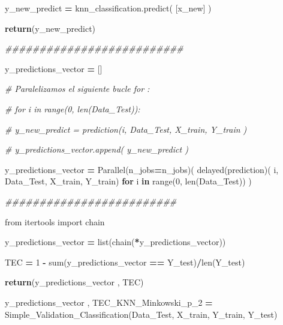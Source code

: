 \documentclass[
  11pt,
  a4paper,
]{article}
\newenvironment{Shaded}{\begin{snugshade}}{\end{snugshade}}
\newcommand{\BuiltInTok}[1]{#1}
\newcommand{\CommentTok}[1]{\textcolor[rgb]{0.56,0.35,0.01}{\textit{#1}}}
\newcommand{\ControlFlowTok}[1]{\textcolor[rgb]{0.13,0.29,0.53}{\textbf{#1}}}
\newcommand{\DecValTok}[1]{\textcolor[rgb]{0.00,0.00,0.81}{#1}}
\newcommand{\ImportTok}[1]{#1}
\newcommand{\KeywordTok}[1]{\textcolor[rgb]{0.13,0.29,0.53}{\textbf{#1}}}
\newcommand{\NormalTok}[1]{#1}
\newcommand{\OperatorTok}[1]{\textcolor[rgb]{0.81,0.36,0.00}{\textbf{#1}}}
\begin{document}
\begin{Shaded}
\begin{Highlighting}[]
\NormalTok{     y\_new\_predict }\OperatorTok{=}\NormalTok{ knn\_classification.predict( [x\_new] )}

     \ControlFlowTok{return}\NormalTok{(y\_new\_predict)}

    \CommentTok{\#\#\#\#\#\#\#\#\#\#\#\#\#\#\#\#\#\#\#\#\#\#\#\#\#\#}

\NormalTok{    y\_predictions\_vector }\OperatorTok{=}\NormalTok{ []}

    \CommentTok{\# Paralelizamos el siguiente bucle for :}

    \CommentTok{\# for i in  range(0, len(Data\_Test)):}

        \CommentTok{\# y\_new\_predict = prediction(i, Data\_Test, X\_train, Y\_train )}

        \CommentTok{\# y\_predictions\_vector.append( y\_new\_predict )}

    
\NormalTok{    y\_predictions\_vector }\OperatorTok{=}\NormalTok{ Parallel(n\_jobs}\OperatorTok{=}\NormalTok{n\_jobs)( delayed(prediction)( i, Data\_Test, X\_train, Y\_train) }\ControlFlowTok{for}\NormalTok{ i }\KeywordTok{in} \BuiltInTok{range}\NormalTok{(}\DecValTok{0}\NormalTok{, }\BuiltInTok{len}\NormalTok{(Data\_Test)) )}

    \CommentTok{\#\#\#\#\#\#\#\#\#\#\#\#\#\#\#\#\#\#\#\#\#\#\#\#\#}

    \ImportTok{from}\NormalTok{ itertools }\ImportTok{import}\NormalTok{ chain}

\NormalTok{    y\_predictions\_vector }\OperatorTok{=} \BuiltInTok{list}\NormalTok{(chain(}\OperatorTok{*}\NormalTok{y\_predictions\_vector))}

\NormalTok{    TEC }\OperatorTok{=} \DecValTok{1} \OperatorTok{{-}} \BuiltInTok{sum}\NormalTok{(y\_predictions\_vector }\OperatorTok{==}\NormalTok{ Y\_test)}\OperatorTok{/}\BuiltInTok{len}\NormalTok{(Y\_test)     }

 
    \ControlFlowTok{return}\NormalTok{(y\_predictions\_vector , TEC)}
\end{Highlighting}
\end{Shaded}

\begin{Shaded}
\begin{Highlighting}[]
\NormalTok{y\_predictions\_vector , TEC\_KNN\_Minkowski\_p\_2 }\OperatorTok{=}\NormalTok{ Simple\_Validation\_Classification(Data\_Test, X\_train, Y\_train, Y\_test)}
\end{Highlighting}
\end{Shaded}
\end{document}
